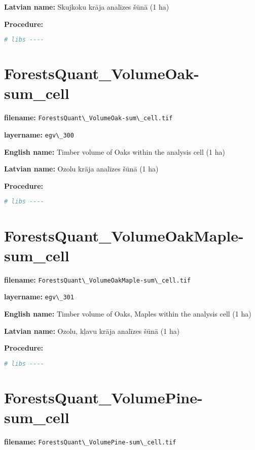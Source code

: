 \documentclass[
]{book}
\newcommand{\passthrough}[1]{#1}
\begin{document}
\textbf{Latvian name:} Skujkoku krāja analīzes šūnā (1 ha)

\textbf{Procedure:}

\begin{lstlisting}[language=R]
# libs ----
\end{lstlisting}

\section{ForestsQuant\_VolumeOak-sum\_cell}\label{ch06.300}

\textbf{filename:} \passthrough{\lstinline!ForestsQuant\_VolumeOak-sum\_cell.tif!}

\textbf{layername:} \passthrough{\lstinline!egv\_300!}

\textbf{English name:} Timber volume of Oaks within the analysis cell (1 ha)

\textbf{Latvian name:} Ozolu krāja analīzes šūnā (1 ha)

\textbf{Procedure:}

\begin{lstlisting}[language=R]
# libs ----
\end{lstlisting}

\section{ForestsQuant\_VolumeOakMaple-sum\_cell}\label{ch06.301}

\textbf{filename:} \passthrough{\lstinline!ForestsQuant\_VolumeOakMaple-sum\_cell.tif!}

\textbf{layername:} \passthrough{\lstinline!egv\_301!}

\textbf{English name:} Timber volume of Oaks, Maples within the analysis cell (1 ha)

\textbf{Latvian name:} Ozolu, kļavu krāja analīzes šūnā (1 ha)

\textbf{Procedure:}

\begin{lstlisting}[language=R]
# libs ----
\end{lstlisting}

\section{ForestsQuant\_VolumePine-sum\_cell}\label{ch06.302}

\textbf{filename:} \passthrough{\lstinline!ForestsQuant\_VolumePine-sum\_cell.tif!}
\end{document}
